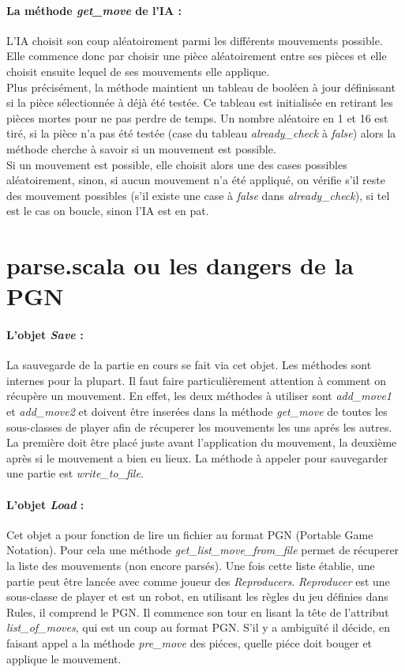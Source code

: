 \documentclass[a4paper]{article}
\begin{document}
\paragraph{La méthode \textit{get\_move} de l'IA :}L'IA choisit son coup aléatoirement parmi les différents mouvements possible. Elle commence donc par choisir une pièce aléatoirement entre ses pièces et elle choisit ensuite lequel de ses mouvements elle applique. \\ 

Plus précisément, la méthode maintient un tableau de booléen à jour définissant si la pièce sélectionnée à déjà été testée. Ce tableau est initialisée en retirant les pièces mortes pour ne pas perdre de temps. Un nombre aléatoire en 1 et 16 est tiré, si la pièce n'a pas été testée (case du tableau \textit{already\_check} à \textit{false}) alors la méthode cherche à savoir si un mouvement est possible. \\

Si un mouvement est possible, elle choisit alors une des cases possibles aléatoirement, sinon, si aucun mouvement n'a été appliqué, on vérifie s'il reste des mouvement possibles (s'il existe une case à \textit{false} dans \textit{already\_check}), si tel est le cas on boucle, sinon l'IA est en pat. 

\section{parse.scala ou les dangers de la PGN}

\paragraph{L'objet \textit{Save} :} La sauvegarde de la partie en cours se fait via cet objet. Les méthodes sont internes pour la plupart. Il faut faire particulièrement attention à comment on récupère un mouvement. En effet, les deux méthodes à utiliser sont \textit{add\_move1} et \textit{add\_move2} et doivent être inserées dans la méthode \textit{get\_move} de toutes les sous-classes de player afin de récuperer les mouvements les uns aprés les autres. La première doit être placé juste avant l'application du mouvement, la deuxième après si le mouvement a bien eu lieux. La méthode à appeler pour sauvegarder une partie est \textit{write\_to\_file}.

\paragraph{L'objet \textit{Load} :} Cet objet a pour fonction de lire un fichier au format PGN (Portable Game Notation). Pour cela une méthode \textit{get\_list\_move\_from\_file} permet de récuperer la liste des mouvements (non encore parsés). Une fois cette liste établie, une partie peut être lancée avec comme joueur des \textit{Reproducers}. \textit{Reproducer} est une sous-classe de player et est un robot, en utilisant les règles du jeu définies dans Rules, il comprend le PGN. Il commence son tour en lisant la tête de l'attribut \textit{list\_of\_moves}, qui est un coup au format PGN. S'il y a ambiguïté il décide, en faisant appel a la méthode \textit{pre\_move} des piéces, quelle piéce doit bouger et applique le mouvement.
\end{document}
